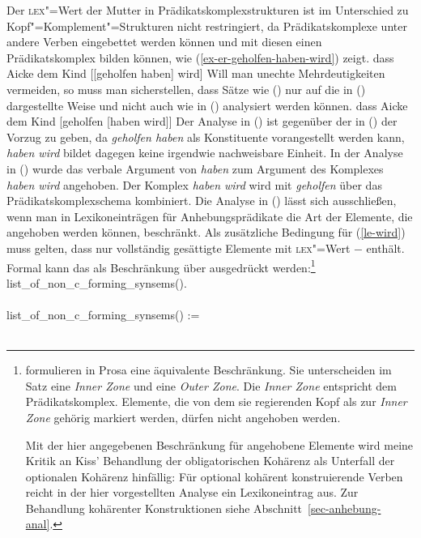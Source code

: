 Der \textsc{lex}"=Wert der Mutter in Prädikatskomplexstrukturen ist im Unterschied zu Kopf"=Komplement"=Strukturen
nicht restringiert, da Prädikatskomplexe unter andere Verben eingebettet werden können 
und mit diesen einen Prädikatskomplex bilden können, wie (\ref{ex-er-geholfen-haben-wird}) zeigt.
\ea
\label{ex-er-geholfen-haben-wird}
dass Aicke dem Kind [[geholfen haben] wird]
\z
Will man unechte Mehrdeutigkeiten vermeiden, so muss man sicherstellen, dass Sätze wie () nur auf die
in () dargestellte Weise und nicht auch wie in () analysiert werden können.
\ea
\label{bsp-non-complex-forming}
dass Aicke dem Kind [geholfen [haben wird]]
\z
Der Analyse in () ist gegenüber der in () der Vorzug zu geben, da \emph{geholfen
haben} als Konstituente vorangestellt werden kann, \emph{haben wird} bildet dagegen keine irgendwie
nachweisbare Einheit.
In der Analyse in () wurde das verbale Argument von \emph{haben} zum Argument des Komplexes
\emph{haben wird} angehoben. Der Komplex \emph{haben wird} wird mit \emph{geholfen} über das Prädikatskomplexschema
kombiniert. Die Analyse in () lässt sich ausschließen, wenn man in Lexikoneinträgen für Anhebungsprädikate
die Art der Elemente, die angehoben werden können, beschränkt. Als zusätzliche Bedingung
für (\ref{le-wird}) muss gelten, dass  nur vollständig gesättigte
Elemente mit \textsc{lex}"=Wert $-$ enthält. Formal kann das als Beschränkung über 
ausgedrückt werden:\footnote{
        \citet{BvN98a} formulieren in Prosa eine äquivalente Beschränkung. Sie unterscheiden
        im Satz eine \emph{Inner Zone} und eine \emph{Outer Zone}. Die \emph{Inner Zone}
        entspricht dem Prädikatskomplex. Elemente, die von dem sie regierenden Kopf
        als zur \emph{Inner Zone} gehörig markiert werden, dürfen nicht angehoben werden.

Mit der hier angegebenen Beschränkung für angehobene Elemente wird
        meine Kritik \citep[--352]{Mueller99a} an Kiss' Behandlung der obligatorischen Kohärenz
        als Unterfall der optionalen Kohärenz \citep[]{Kiss95a} hinfällig: Für optional kohärent konstruierende
        Verben reicht in der hier vorgestellten Analyse ein Lexikoneintrag aus. Zur Behandlung
        kohärenter Konstruktionen siehe Abschnitt~\ref{sec-anhebung-anal}.%
%
}
\eas
\label{constr-non-complex-forming}%
list\_of\_non\_c\_forming\_synsems(\eliste).\\\\
list\_of\_non\_c\_forming\_synsems() :=\\\\
